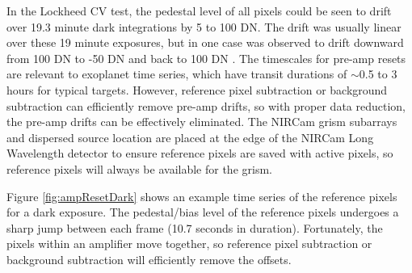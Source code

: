 \documentclass{aastex62}
\begin{document}
In the Lockheed CV test, the pedestal level of all pixels could be seen to drift over 19.3 minute dark integrations by 5 to 100 DN.
The drift was usually linear over these 19 minute exposures, but in one case was observed to drift downward from 100 DN to -50 DN and back to 100 DN \citep{robberto2014refPixPreAmp}.
The timescales for pre-amp resets are relevant to exoplanet time series, which have transit durations of $\sim$0.5 to 3 hours for typical targets.
However, reference pixel subtraction or background subtraction can efficiently remove pre-amp drifts, so with proper data reduction, the pre-amp drifts can be effectively eliminated.
The NIRCam grism subarrays and dispersed source location are placed at the edge of the NIRCam Long Wavelength detector to ensure reference pixels are saved with active pixels, so reference pixels will always be available for the grism.

Figure \ref{fig:ampResetDark} shows an example time series of the reference pixels for a dark exposure.
The pedestal/bias level of the reference pixels undergoes a sharp jump between each frame (10.7 seconds in duration).
Fortunately, the pixels within an amplifier move together, so reference pixel subtraction or background subtraction will efficiently remove the offsets.
\end{document}
